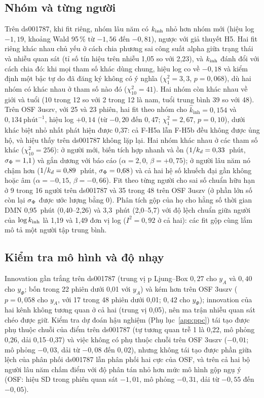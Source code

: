 \subsection{Nhóm và từng người}
Trên ds001787, khi fit riêng, nhóm lâu năm có $k_{\mathrm{inh}}$ nhỏ hơn nhóm mới (hiệu log $-1{,}19$, khoảng Wald 95\,\% từ $-1{,}56$ đến $-0{,}81$), ngược với giả thuyết H5. Hai fit riêng khác nhau chủ yếu ở cách chia phương sai công suất alpha giữa trạng thái và nhiễu quan sát (tỉ số tín hiệu trên nhiễu 1,05 so với 2,23), và $k_{\mathrm{inh}}$ đánh đổi với cách chia đó: khi mọi tham số khác dùng chung, hiệu log co về $-0{,}18$ và kiểm định một bậc tự do đã đăng ký không có ý nghĩa ($\chi^2_1=3{,}3$, $p=0{,}068$), dù hai nhóm có khác nhau ở tham số nào đó ($\chi^2_{10}=41$). Hai nhóm còn khác nhau về giới và tuổi (10 trong 12 so với 2 trong 12 là nam, tuổi trung bình 39 so với 48). Trên OSF 3uszv, với 25 và 23 phiên, hai fit theo nhóm cho $\hat k_{\mathrm{inh}}=0{,}154$ và $0{,}134~\text{phút}^{-1}$, hiệu log $+0{,}14$ (từ $-0{,}20$ đến $0{,}47$; $\chi^2_1=2{,}67$, $p=0{,}10$), dưới khác biệt nhỏ nhất phát hiện được 0,37: cả F-H5a lẫn F-H5b đều không được ủng hộ, và hiệu thấy trên ds001787 không lặp lại. Hai nhóm khác nhau ở các tham số khác ($\chi^2_{10}=256$): ở người mới, biến tích hợp nhanh và ồn ($1/k_{d}=0{,}33$~phút, $\sigma_{\Phi}=1{,}1$) và gắn dương với báo cáo ($\alpha=2{,}0$, $\beta=+0{,}75$); ở người lâu năm nó chậm hơn ($1/k_{d}=0{,}89$~phút, $\sigma_{\Phi}=0{,}68$) và cả hai hệ số khuếch đại gần không hoặc âm ($\alpha=-0{,}15$, $\beta=-0{,}66$). Fit theo từng người cho sai số chuẩn hữu hạn ở 9 trong 16 người trên ds001787 và 35 trong 48 trên OSF 3uszv (ở phần lớn số còn lại $\sigma_{\Phi}$ được ước lượng bằng 0). Phân tích gộp của họ cho hằng số thời gian DMN 0,95~phút (0,40--2,26) và 3,3~phút (2,0--5,7) với độ lệch chuẩn giữa người của $\log k_{\mathrm{inh}}$ là 1,19 và 1,49 đơn vị log ($I^2=0{,}92$ ở cả hai): các fit gộp cùng lắm mô tả một người tập trung bình.

\subsection{Kiểm tra mô hình và độ nhạy}
Innovation gần trắng trên ds001787 (trung vị p Ljung--Box $0{,}27$ cho $y_A$ và $0{,}40$ cho $y_\Phi$; bốn trong 22 phiên dưới 0,01 với $y_A$) và kém hơn trên OSF 3uszv ($p=0{,}058$ cho $y_A$, với 17 trong 48 phiên dưới 0,01; $0{,}42$ cho $y_\Phi$); innovation của hai kênh không tương quan ở cả hai (trung vị 0,05), nên ma trận nhiễu quan sát chéo được giữ. Kiểm tra dự đoán hậu nghiệm (Phụ lục~\ref{app:ppc}) tái tạo được phụ thuộc chuỗi của điểm trên ds001787 (tự tương quan trễ 1 là 0,22, mô phỏng 0,26, dải 0,15--0,37) và việc không có phụ thuộc chuỗi trên OSF 3uszv ($-0{,}01$; mô phỏng $-0{,}03$, dải từ $-0{,}08$ đến $0{,}02$), nhưng không tái tạo được phần giữa lệch của phân phối ds001787 lẫn phân phối hai cực của OSF, và trên cả hai bộ người lâu năm chấm điểm với độ phân tán nhỏ hơn mức mô hình gộp ngụ ý (OSF: hiệu SD trong phiên quan sát $-1{,}01$, mô phỏng $-0{,}31$, dải từ $-0{,}55$ đến $-0{,}05$).

